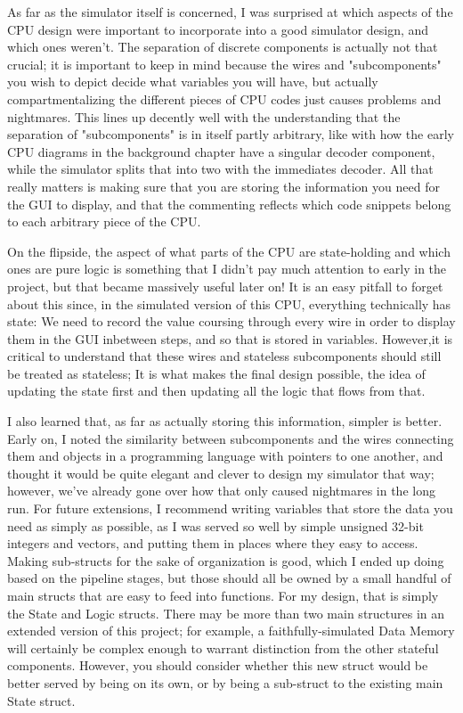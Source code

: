 \documentclass[12pt,twoside]{reedthesis}
\begin{document}
As far as the simulator itself is concerned, I was surprised at which aspects of the CPU design were important to incorporate into a good simulator design, and which ones weren't. The separation of discrete components is actually not that crucial; it is important to keep in mind because the wires and "subcomponents" you wish to depict decide what variables you will have, but actually compartmentalizing the different pieces of CPU codes just causes problems and nightmares. This lines up decently well with the understanding that the separation of "subcomponents" is in itself partly arbitrary, like with how the early CPU diagrams in the background chapter have a singular decoder component, while the simulator splits that into two with the immediates decoder. All that really matters is making sure that you are storing the information you need for the GUI to display, and that the commenting reflects which code snippets belong to each arbitrary piece of the CPU.

On the flipside, the aspect of what parts of the CPU are state-holding and which ones are pure logic is something that I didn't pay much attention to early in the project, but that became massively useful later on! It is an easy pitfall to forget about this since, in the simulated version of this CPU, everything technically has state: We need to record the value coursing through every wire  in order to display them in the GUI inbetween steps, and so that is stored in variables. However,it is critical to understand that these wires and stateless subcomponents  should still be treated as stateless; It is what makes the final design possible, the idea of updating the state first and then updating all the logic that flows from that.

I also learned that, as far as actually storing this information, simpler is better. Early on, I noted the similarity between subcomponents and the wires connecting them and objects in a programming language with pointers to one another, and thought it would be quite elegant and clever to design my simulator that way; however, we've already gone over how that only caused nightmares in the long run. For future extensions, I recommend writing variables that store the data you need as simply as possible, as I was served so well by simple unsigned 32-bit integers and vectors, and putting them in places where they easy to access. Making sub-structs for the sake of organization is good, which I ended up doing based on the pipeline stages, but those should all be owned by a small handful of main structs that are easy to feed into functions. For my design, that is simply the State and Logic structs. There may be more than two main structures in an extended version of this project; for example, a faithfully-simulated Data Memory will certainly be complex enough to warrant distinction from the other stateful components. However, you should consider whether this new struct would be better served by being on its own, or by being a sub-struct to the existing main State struct.
\end{document}
